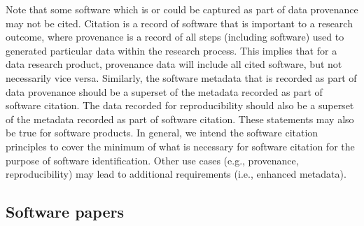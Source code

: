 \documentclass[12pt, oneside]{amsart}
\newcommand{\dmnote}[1]{ {\textcolor{purple} { ***DM: #1 }}} %
\newcommand{\ssnote}[1]{ {\textcolor{bondiblue} { ***SS: #1}}} %
\begin{document}

Note that some software which is or could be captured as part of data provenance may not be cited.
Citation is a record of software that is important to a research outcome, where provenance is a record of all steps (including software) used to generated particular data within the research process.
This implies that for a data research product, provenance data will include all cited software, but not necessarily vice versa.
Similarly, the software metadata that is recorded as part of data provenance should be a superset of the metadata recorded as part of software citation.
The data recorded for reproducibility should also be a superset of the metadata recorded as part of software citation.
These statements may also be true for software products.
In general, we intend the software citation principles to cover the minimum of what is necessary for software citation for the purpose of software identification.
Other use cases (e.g., provenance, reproducibility) may lead to additional requirements (i.e., enhanced metadata).

\subsection{Software papers} \label{sec:software_papers}
\end{document}
